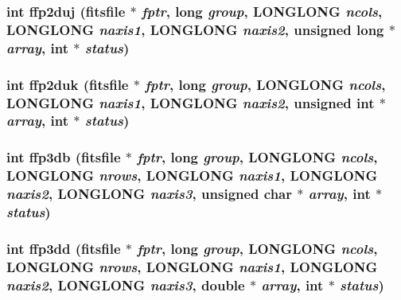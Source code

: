 \subsubsection{\setlength{\rightskip}{0pt plus 5cm}int ffp2duj (\bf{fitsfile} $\ast$ {\em fptr}, long {\em group}, \bf{LONGLONG} {\em ncols}, \bf{LONGLONG} {\em naxis1}, \bf{LONGLONG} {\em naxis2}, unsigned long $\ast$ {\em array}, int $\ast$ {\em status})}\label{fitsio__64_8h_894a5478ff80f7822a394abc4cac5db3}


\subsubsection{\setlength{\rightskip}{0pt plus 5cm}int ffp2duk (\bf{fitsfile} $\ast$ {\em fptr}, long {\em group}, \bf{LONGLONG} {\em ncols}, \bf{LONGLONG} {\em naxis1}, \bf{LONGLONG} {\em naxis2}, unsigned int $\ast$ {\em array}, int $\ast$ {\em status})}\label{fitsio__64_8h_7daa3c68214e4bf5e9510489d23c8344}


\subsubsection{\setlength{\rightskip}{0pt plus 5cm}int ffp3db (\bf{fitsfile} $\ast$ {\em fptr}, long {\em group}, \bf{LONGLONG} {\em ncols}, \bf{LONGLONG} {\em nrows}, \bf{LONGLONG} {\em naxis1}, \bf{LONGLONG} {\em naxis2}, \bf{LONGLONG} {\em naxis3}, unsigned char $\ast$ {\em array}, int $\ast$ {\em status})}\label{fitsio__64_8h_509db23e215c4ac2df334edd78851e1e}


\subsubsection{\setlength{\rightskip}{0pt plus 5cm}int ffp3dd (\bf{fitsfile} $\ast$ {\em fptr}, long {\em group}, \bf{LONGLONG} {\em ncols}, \bf{LONGLONG} {\em nrows}, \bf{LONGLONG} {\em naxis1}, \bf{LONGLONG} {\em naxis2}, \bf{LONGLONG} {\em naxis3}, double $\ast$ {\em array}, int $\ast$ {\em status})}\label{fitsio__64_8h_07253c7bb04c4b09022517aff697976b}


